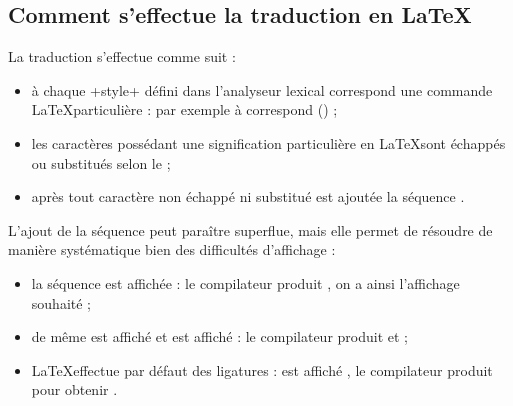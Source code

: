 \subsection{Comment s'effectue la traduction en \LaTeX}

La traduction s'effectue comme suit :
\begin{itemize}
  \item à chaque \ggs+style+ défini dans l'analyseur lexical correspond une commande \LaTeX particulière : par exemple à  correspond  () ;
  \item les caractères possédant une signification particulière en \LaTeX sont échappés ou substitués selon le  ;
  \item après tout caractère non échappé ni substitué est ajoutée la séquence \tpp{\{\}}.
\end{itemize}

L'ajout de la séquence \tpp{\{\}} peut paraître superflue, mais elle permet de résoudre de manière systématique bien des difficultés d'affichage :
\begin{itemize}
  \item la séquence \tpp{-{}-} est affichée \tpp{--} : le compilateur produit \tpp{-\{\}-\{\}}, on a ainsi l'affichage souhaité \tpp{-{}-} ;
  \item de même \tpp{\textgreater{}\textgreater} est affiché \tpp{\textgreater\textgreater} et \tpp{\textless{}\textless} est affiché \tpp{\textless\textless} : le compilateur produit \tpp{\textgreater\{\}\textgreater\{\}} et  \tpp{\textless\{\}\textless\{\}} ;
  \item \LaTeX effectue par défaut des ligatures :  est affiché , le compilateur produit  pour obtenir  .
\end{itemize}



